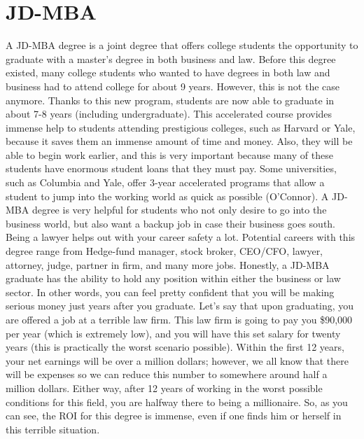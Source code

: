 \chapter{JD-MBA}
\begin{multicols}{2}

A JD-MBA degree is a joint degree that offers college students the opportunity to graduate with a master’s degree in both business and law. Before this degree existed, many college students who wanted to have degrees in both law and business had to attend college for about 9 years. However, this is not the case anymore. Thanks to this new program, students are now able to graduate in about 7-8 years (including undergraduate). This accelerated course provides immense help to students attending prestigious colleges, such as Harvard or Yale, because it saves them an immense amount of time and money. Also, they will be able to begin work earlier, and this is very important because many of these students have enormous student loans that they must pay.  Some universities, such as Columbia and Yale, offer 3-year accelerated programs that allow a student to jump into the working world as quick as possible (O’Connor). A JD-MBA degree is very helpful for students who not only desire to go into the business world, but also want a backup job in case their business goes south. Being a lawyer helps out with your career safety a lot. Potential careers with this degree range from Hedge-fund manager, stock broker, CEO/CFO, lawyer, attorney, judge, partner in firm, and many more jobs. Honestly, a JD-MBA graduate has the ability to hold any position within either the business or law sector. In other words, you can feel pretty confident that you will be making serious money just years after you graduate. Let's say that upon graduating, you are offered a job at a terrible law firm. This law firm is going to pay you \$90,000 per year (which is extremely low), and you will have this set salary for twenty years (this is practically the worst scenario possible). Within the first 12 years, your net earnings will be over a million dollars; however, we all know that there will be expenses so we can reduce this number to somewhere around half a million dollars. Either way, after 12 years of working in the worst possible conditions for this field, you are halfway there to being a millionaire. So, as you can see, the ROI for this degree is immense, even if one finds him or herself in this terrible situation.  

\end{multicols}

